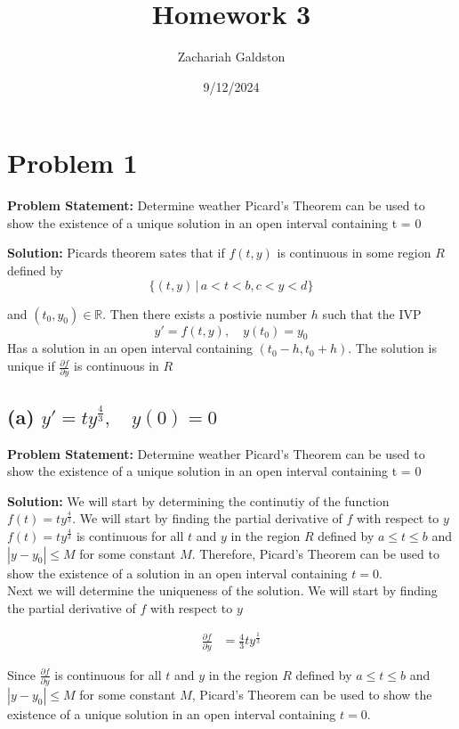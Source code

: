 \documentclass[12pt, letterpaper]{article}
\title{Homework 3}
\author{Zachariah Galdston}
\date{9/12/2024}
\begin{document}
\maketitle

\section*{Problem 1}

\textbf{Problem Statement:} Determine weather Picard's Theorem can be used to show the existence of a unique solution in an open interval containing t = 0

\textbf{Solution:} Picards theorem sates that if $f(t,y)$ is continuous in some region $R$ defined by 
\[ \{(t,y) \,|\, a < t < b, c < y < d\} \] 

and $(t_0, y_0) \in \mathbb{R}$. Then there exists a postivie number $h$ such that the IVP
\[ y' = f(t,y), \quad y(t_0) = y_0\]
Has a solution in an open interval containing $(t_0 - h, t_0 + h)$. The solution is unique if $\frac{\partial f}{\partial y}$ is continuous in $R$

\subsection*{(a) $y' = ty^{\frac{4}{3}}, \quad y(0) = 0$}
\textbf{Problem Statement:} Determine weather Picard's Theorem can be used to show the existence of a unique solution in an open interval containing t = 0

\textbf{Solution:} We will start by determining the continutiy of the function $f(t) = ty^{\frac{4}{3}}$. We will start by finding the partial derivative of $f$ with respect to $y$ \\

$f(t) = ty^{\frac{4}{3}}$ is continuous for all $t$ and $y$ in the region $R$ defined by $a \leq t \leq b$ and $|y - y_0| \leq M$ for some constant $M$. Therefore, Picard's Theorem can be used to show the existence of a  solution in an open interval containing $t = 0$. \\

Next we will determine the uniqueness of the solution. We will start by finding the partial derivative of $f$ with respect to $y$

\begin{align*}
\frac{\partial f}{\partial y} &= \frac{4}{3}ty^{\frac{1}{3}}
\end{align*}

Since $\frac{\partial f}{\partial y}$ is continuous for all $t$ and $y$ in the region $R$ defined by $a \leq t \leq b$ and $|y - y_0| \leq M$ for some constant $M$, Picard's Theorem can be used to show the existence of a unique solution in an open interval containing $t = 0$.
\end{document}

